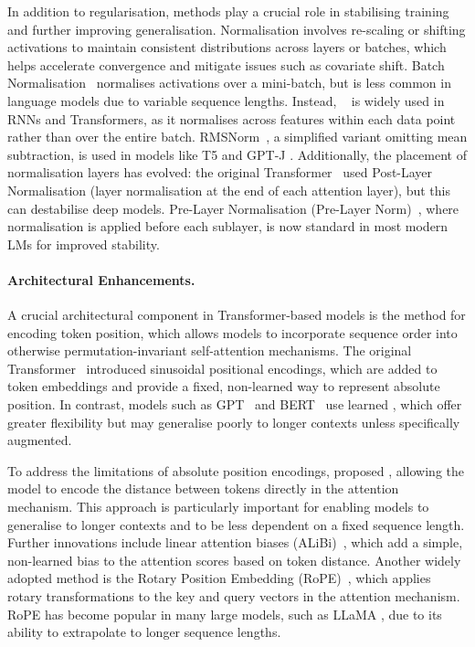 In addition to regularisation,  methods play a crucial role in stabilising training and further improving generalisation. Normalisation involves re-scaling or shifting activations to maintain consistent distributions across layers or batches, which helps accelerate convergence and mitigate issues such as  covariate shift. Batch Normalisation~\citep{ioffe2015batchnorm} normalises activations over a mini-batch, but is less common in language models due to variable sequence lengths. Instead, ~\citep{ba2016layernorm} is widely used in RNNs and Transformers, as it normalises across features within each data point rather than over the entire batch. RMSNorm~\citep{zhang2019rmsnorm}, a simplified variant omitting mean subtraction, is used in models like T5 \citep{raffel2020t5} and GPT-J \citep{eleutherai2021gptj}. Additionally, the placement of normalisation layers has evolved: the original Transformer~\citep{vaswani2017attention} used Post-Layer Normalisation (layer normalisation at the end of each attention layer), but this can destabilise deep models. Pre-Layer Normalisation (Pre-Layer Norm)~\citep{xiong2020layer}, where normalisation is applied before each sublayer, is now standard in most modern LMs for improved stability.

\paragraph{Architectural Enhancements.}
A crucial architectural component in Transformer-based models is the method for encoding token position, which allows models to incorporate sequence order into otherwise permutation-invariant self-attention mechanisms. The original Transformer~\citep{vaswani2017attention} introduced sinusoidal positional encodings, which are added to token embeddings and provide a fixed, non-learned way to represent absolute position. In contrast, models such as GPT~\citep{radford2018gpt1} and BERT~\citep{devlin2019bert} use learned , which offer greater flexibility but may generalise poorly to longer contexts unless specifically augmented.

To address the limitations of absolute position encodings, \citet{shaw2018self} proposed , allowing the model to encode the distance between tokens directly in the attention mechanism. This approach is particularly important for enabling models to generalise to longer contexts and to be less dependent on a fixed sequence length. Further innovations include linear attention biases (ALiBi)~\citep{press2021train}, which add a simple, non-learned bias to the attention scores based on token distance. Another widely adopted method is the Rotary Position Embedding (RoPE)~\citep{su2024rope}, which applies rotary transformations to the key and query vectors in the attention mechanism. RoPE has become popular in many large models, such as LLaMA \citep{touvron2023llama}, due to its ability to extrapolate to longer sequence lengths.

